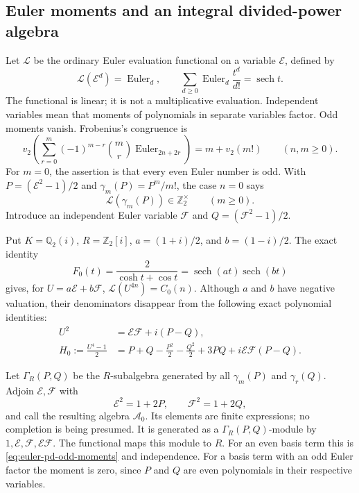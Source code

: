 \subsection{Euler moments and an integral divided-power algebra}

Let $\mathcal L$ be the ordinary Euler evaluation functional on a
variable $\mathcal E$, defined by
\[
 \mathcal L(\mathcal E^d)=\operatorname{Euler}_d,
 \qquad \sum_{d\geq0}\operatorname{Euler}_d\frac{t^d}{d!}
                  =\operatorname{sech}t.
\]
The functional is linear; it is not a multiplicative evaluation.
Independent variables mean that moments of polynomials in separate
variables factor. Odd moments vanish. Frobenius's congruence is
\begin{equation}
 v_2\left(\sum_{r=0}^m(-1)^{m-r}\binom mr
                 \operatorname{Euler}_{2n+2r}\right)
       =m+v_2(m!)\qquad(n,m\geq0).
 \label{eq:classical-frobenius-exact}
\end{equation}
For $m=0$, the assertion is that every even Euler number is odd.
With $P=(\mathcal E^2-1)/2$ and
$\gamma_m(P)=P^m/m!$, the case $n=0$ says
\begin{equation}
 \mathcal L(\gamma_m(P))\in\mathbb Z_2^{\times}
                 \qquad(m\geq0).
 \label{eq:euler-pd-odd-moments}
\end{equation}
Introduce an independent Euler variable $\mathcal F$ and
$Q=(\mathcal F^2-1)/2$.

Put $K=\mathbb Q_2(i)$, $R=\mathbb Z_2[i]$,
$a=(1+i)/2$, and $b=(1-i)/2$. The exact identity
\begin{equation}
 F_0(t)=\frac{2}{\cosh t+\cos t}
       =\operatorname{sech}(at)\operatorname{sech}(bt)
 \label{eq:four-euler-factorization}
\end{equation}
gives, for $U=a\mathcal E+b\mathcal F$,
$\mathcal L(U^{4n})=C_0(n)$. Although $a$ and $b$ have negative
valuation, their denominators disappear from the following exact
polynomial identities:
\begin{align}
 U^2&=\mathcal E\mathcal F+i(P-Q),\nonumber\\
 H_0:=\frac{U^4-1}{2}
   &=P+Q-\frac{P^2}{2}-\frac{Q^2}{2}
                 +3PQ+i\mathcal E\mathcal F(P-Q).
 \label{eq:four-euler-H}
\end{align}

Let $\Gamma_R(P,Q)$ be the $R$-subalgebra generated by all
$\gamma_m(P)$ and $\gamma_r(Q)$. Adjoin $\mathcal E,\mathcal F$ with
\[
 \mathcal E^2=1+2P,\qquad \mathcal F^2=1+2Q,
\]
and call the resulting algebra $\mathcal A_0$. Its elements are finite
expressions; no completion is being presumed. It is generated as a
$\Gamma_R(P,Q)$-module by $1,\mathcal E,\mathcal F,\mathcal E\mathcal F$.
The functional maps this module to $R$. For an even basis term this is
\eqref{eq:euler-pd-odd-moments} and independence. For a basis term with
an odd Euler factor the moment is zero, since $P$ and $Q$ are even
polynomials in their respective variables.

